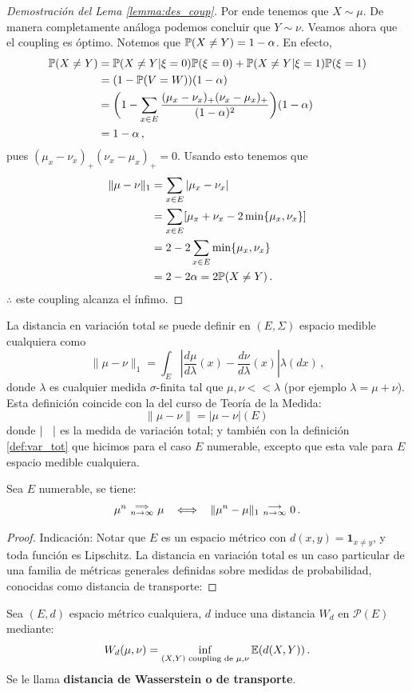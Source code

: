 \begin{proof}[Demostración del Lema \ref{lemma:des_coup}]
Por ende tenemos que $X\sim\mu$. De manera completamente análoga podemos concluir que $Y\sim\nu$.
Veamos ahora que el coupling es óptimo. Notemos que $\P(X\neq Y)=1-\alpha$. En efecto,
\begin{alignat*}{2}
    \P(X\neq Y) & = \P(X\neq Y|\xi=0)\P(\xi=0)+\P(X\neq Y|\xi=1)\P(\xi=1) \\
     & = (1-\P(V=W))(1-\alpha) \\
     & = \bigg(1-\displaystyle\sum_{x\in E}\frac{(\mu_x-\nu_x)_+(\nu_x-\mu_x)_+}{(1-\alpha)^2}\bigg)(1-\alpha) \\
     & = 1-\alpha \, ,
\end{alignat*}
pues $(\mu_x-\nu_x)_+(\nu_x-\mu_x)_+ = 0$. Usando esto tenemos que
\begin{alignat*}{2}
    \|\mu-\nu\|_1 & = \displaystyle \sum_{x\in E}|\mu_x-\nu_x| \\
     & = \displaystyle \sum_{x\in E}[\mu_x+\nu_x-2\min\{\mu_x,\nu_x\}] \\
     & = \displaystyle 2-2\sum_{x\in E}\min\{\mu_x,\nu_x\} \\
     & = 2-2\alpha = 2\P(X\neq Y) \, .
\end{alignat*}
$\therefore$ este coupling alcanza el ínfimo. \findem
\negro 
\end{proof}

\begin{remark}
La distancia en variación total se puede definir en $(E,\Sigma)$ espacio medible cualquiera como
$$ \|\mu-\nu\|_1 = \displaystyle \int_E|\frac{d\mu}{d\lambda}(x)-\frac{d\nu}{d\lambda}(x)|\lambda(dx)\, ,$$
donde $\lambda$ es cualquier medida $\sigma$-finita tal que $\mu,\nu<<\lambda$ (por ejemplo $\lambda=\mu+\nu$).
\\ Esta definición coincide con la del curso de Teoría de la Medida:
$$ \|\mu-\nu\|=|\mu-\nu|(E) \, $$
donde $|\espacio|$ es la medida de variación total; y también con la definición \ref{def:var_tot} que hicimos para el caso $E$ numerable, excepto que esta vale para $E$ espacio medible cualquiera.
\end{remark}
\begin{proposition}%
Sea $E$ numerable, se tiene:
$$ \mu^n\convdebil\mu \espacio \Longleftrightarrow \espacio \|\mu^n-\mu\|_1\conv0\,.$$
\end{proposition}
\begin{proof}
\ejercicio \espacio \gris Indicación: Notar que $E$ es un espacio métrico con $d(x,y)=\mathbf{1}_{x\neq y}$, y toda función es Lipschitz.  La distancia en variación total es un caso particular de una familia de m\'etricas generales definidas sobre medidas de probabilidad, conocidas como distancia de transporte: 
\negro
\end{proof}
\begin{proposition}  %
Sea $(E,d)$ espacio métrico cualquiera, $d$ induce una distancia $W_d$ en $\mathcal{P}(E)$ mediante:
$$ W_d(\mu,\nu) = \displaystyle \inf_{(X,Y)\text{ coupling de }\mu,\nu}\E(d(X,Y)) \, .$$
Se le llama \textbf{distancia de Wasserstein o de transporte}.
\end{proposition}

